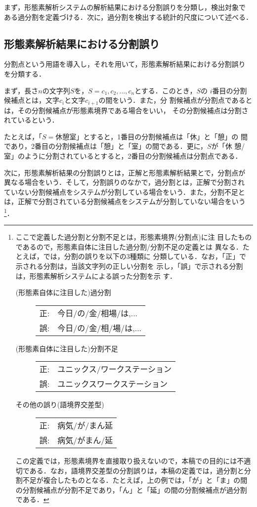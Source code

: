 まず，形態素解析システムの解析結果における分割誤りを分類し，検出対象で
ある過分割を定義づける．次に，過分割を検出する統計的尺度について述べる．

\subsection{形態素解析結果における分割誤り}
\label{sec:error}

分割点という用語を導入し，それを用いて，形態素解析結果における分割誤り
を分類する．

まず，長さ$n$の文字列$S$を，$S=c_1,c_2,...,c_n$とする．このとき，$S$の
$i$番目の分割候補点とは，文字$c_i$と文字$c_{i+1}$の間をいう．また，分
割候補点が分割点であるとは，その分割候補点が形態素境界である場合をいい，
その分割候補点は分割されているという．

たとえば，「$S=休憩室$」とすると，1番目の分割候補点は「休」と「憩」の
間であり，2番目の分割候補点は「憩」と「室」の間である．更に，$S$が「休
憩/室」のように分割されているとすると，2番目の分割候補点は分割点である．

次に，形態素解析結果の分割誤りとは，正解と形態素解析結果とで，分割点が
異なる場合をいう．そして，分割誤りのなかで，過分割とは，正解で分割され
ていない分割候補点をシステムが分割している場合をいう．また，分割不足と
は，正解で分割されている分割候補点をシステムが分割していない場合をいう
\footnote {ここで定義した過分割と分割不足とは，形態素境界(分割点)に注
  目したものであるので，形態素自体に注目した過分割/分割不足の定義とは
  異なる．たとえば，\cite{hisamitsu98}では，分割の誤りを以下の3種類に
  分類している．なお，「正」で示される分割は，当該文字列の正しい分割を
  示し，「誤」で示される分割は，形態素解析システムによる誤った分割を示
  す．
  \begin{description}
  \item[(形態素自体に注目した)過分割]
    \begin{tabular}{ll}
      正: & 今日/の/金/相場/は,...\\
      誤: & 今日/の/金/相/場/は,...\\
    \end{tabular}
  \item[(形態素自体に注目した)分割不足]
    \begin{tabular}{ll}
      正: & ユニックス/ワークステーション\\
      誤: & ユニックスワークステーション\\
    \end{tabular}
  \item[その他の誤り(語境界交差型)]
    \begin{tabular}{ll}
      正: & 病気/が/まん延\\
      誤: & 病気/がまん/延\\
    \end{tabular}
  \end{description}
  この定義では，形態素境界を直接取り扱えないので，本稿での目的には不適
  切である．なお，語境界交差型の分割誤りは，本稿の定義では，過分割と分
  割不足が複合したものとなる．たとえば，上の例では，「が」と「ま」の間
  の分割候補点が分割不足であり，「ん」と「延」の間の分割候補点が過分割
  である．}．

